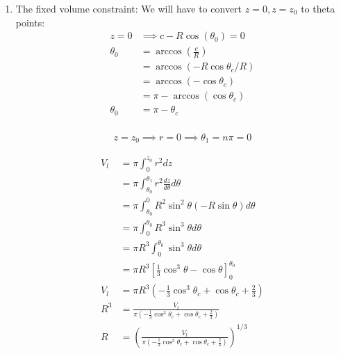 \documentclass{X:/Documents/Coding/Latex/myassignment}
\begin{document}
\begin{enumerate}
\begin{enumerate}
	 \item The fixed volume constraint:
	 We will have to convert $z=0, z=z_0$ to theta points:
	 \begin{align*}
	 	z =0  &\implies  c - R\cos(\theta_0) = 0\\
	 	\theta_0 &= \arccos\left( \frac{c}{R}\right)\\
	 	&= \arccos\left( - R\cos\theta_c/R\right)\\
	 	&= \arccos\left(  - \cos\theta_c\right)\\
	 	&= \pi - \arccos\left(\cos\theta_c\right)\\
	 	\theta_0 &= \pi - \theta_c\\
	 \end{align*}

	 \begin{align*}
	 	z = z_0 \implies r = 0 \implies \theta_1 = n\pi = 0
	 \end{align*}

	 \begin{align*}
	 V_l &= \pi \int_{0}^{z_0} r^2 dz\\
	 	&= \pi \int_{\theta_0}^{\theta_1} r^2 \frac{dz}{d \theta} d\theta\\
	 	&= \pi \int_{\theta_0}^{0} R^2\sin^2\theta (-R\sin\theta) d\theta\\
	 	&= \pi \int_{0}^{\theta_0} R^3\sin^3\theta  d\theta\\
	 	&= \pi R^3 \int_{0}^{\theta_0} \sin^3\theta  d\theta\\
	 	&= \pi R^3 \left[\frac13 \cos^3 \theta -\cos\theta\right]_0^{\theta_0}\\
	 	V_l &= \pi R^3 \left(-\frac13 \cos^3 \theta_c +\cos\theta_c + \frac23\right)\\
	 	R^3 &= \frac{V_l}{\pi\left(-\frac13 \cos^3 \theta_c +\cos\theta_c + \frac23\right)}\\
	 	R &= \left(\frac{V_l}{\pi\left(-\frac13 \cos^3 \theta_c +\cos\theta_c + \frac23\right)}\right)^{1/3}\\
	 \end{align*}


\end{enumerate}
\end{enumerate}
\end{document}
